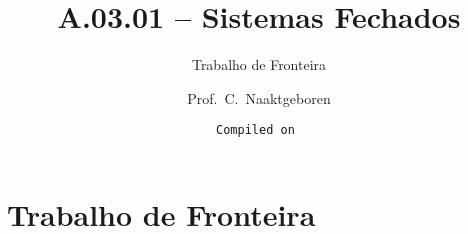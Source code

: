 \usepackage{beamerthemeCopenhagen}
\usepackage[utf8]{inputenc}
\usepackage[english,brazil]{babel} %
\usepackage{pslatex}
\usepackage{amssymb,amsmath}
\usepackage{soul}
\usepackage{xspace}
\newcommand{\enfa}[1]{{\color{enfa}{#1}}}
\newcommand{\gray}[1]{{\color{gray}{#1}}}
\makeatletter
\immediate{} %
\makeatother
\title{A.03.01 -- Sistemas Fechados}
\subtitle{Trabalho de Fronteira}
\author{Prof.~C.~Naaktgeboren}
\date{\tt Compiled on }

\frame{\titlepage}
\section{Trabalho de Fronteira}


